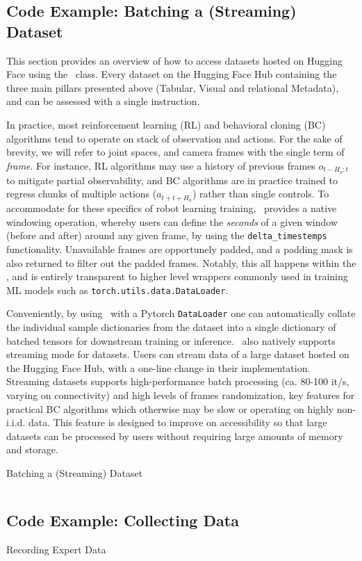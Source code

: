 \subsection{Code Example: Batching a (Streaming) Dataset}

This section provides an overview of how to access datasets hosted on Hugging Face using the \lerobotdataset~class.
Every dataset on the Hugging Face Hub containing the three main pillars presented above (Tabular, Visual and relational Metadata), and can be assessed with a single instruction.

In practice, most reinforcement learning (RL) and behavioral cloning (BC) algorithms tend to operate on stack of observation and actions.
For the sake of brevity, we will refer to joint spaces, and camera frames with the single term of \emph{frame}.
For instance, RL algorithms may use a history of previous frames \(o_{t-H_o:t} \) to mitigate partial observability, and BC algorithms are in practice trained to regress chunks of multiple actions (\(a_{t+t+H_a} \)) rather than single controls.
To accommodate for these specifics of robot learning training, \lerobotdataset~provides a native windowing operation, whereby users can define the \emph{seconds} of a given window (before and after) around any given frame, by using the \texttt{delta\_timestemps} functionality.
Unavailable frames are opportunely padded, and a padding mask is also returned to filter out the padded frames.
Notably, this all happens within the \lerobotdataset, and is entirely transparent to higher level wrappers commonly used in training ML models such as \texttt{torch.utils.data.DataLoader}.

Conveniently, by using \lerobotdataset~with a Pytorch \texttt{DataLoader} one can automatically collate the individual sample dictionaries from the dataset into a single dictionary of batched tensors for downstream training or inference.
\lerobotdataset~also natively supports streaming mode for datasets.
Users can stream data of a large dataset hosted on the Hugging Face Hub, with a one-line change in their implementation.
Streaming datasets supports high-performance batch processing (ca. 80-100 it/s, varying on connectivity) and high levels of frames randomization, key features for practical BC algorithms which otherwise may be slow or operating on highly non-i.i.d. data.
This feature is designed to improve on accessibility so that large datasets can be processed by users without requiring large amounts of memory and storage.

\begin{pbox}[label={ex:dataset-batching}]{Batching a (Streaming) Dataset 
}
\inputminted{python}{snippets/ch1/01_dataset.py}
\end{pbox}

\subsection{Code Example: Collecting Data}
\label{paragraph:collecting-data}

\begin{pbox}[label={ex:record_data}]{Recording Expert Data}
\inputminted{python}{snippets/ch1/02_record_data.py}
\end{pbox}
